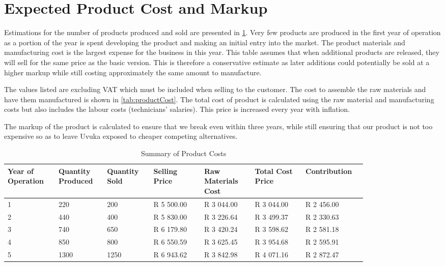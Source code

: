 \section{Expected Product Cost and Markup}
Estimations for the number of products produced and sold are presented in \cref{tab:ProductSales}. Very few products are produced in the first year of operation as a portion of the year is spent developing the product and making an initial entry into the market. The product materials and manufacturing cost is the largest expense for the business in this year. This table assumes that when additional products are released, they will sell for the same price as the basic version. This is therefore a conservative estimate as later additions could potentially be sold at a higher markup while still costing approximately the same amount to manufacture.

The values listed are excluding VAT which must be included when selling to the customer. The cost to assemble the raw materials and have them manufactured is shown in \cref{tab:productCost}. The total cost of product is calculated using the raw material and manufacturing costs but also includes the labour costs (technicians' salaries). This price is increased every year with inflation. 

The markup of the product is calculated to ensure that we break even within three years, while still ensuring that our product is not too expensive so as to leave Uvuka exposed to cheaper competing alternatives.

\begin{table}[htbp]
  \centering
  \caption{Summary of Product Costs}
    \begin{tabular}{p{0.12\linewidth}p{0.11\linewidth}p{0.11\linewidth}p{0.12\linewidth}p{0.12\linewidth}p{0.12\linewidth}p{0.12\linewidth}}
    \toprule
    \raggedright{Year of Operation} & Quantity Produced & Quantity Sold & Selling Price & Raw Materials Cost & \raggedright{Total Cost Price} & Contribution \\
    \midrule
    1     & 220   & 200   & R 5 500.00 & R 3 044.00 & R 3 044.00 & R 2 456.00 \\
    2     & 440   & 400   & R 5 830.00 & R 3 226.64 & R 3 499.37 & R 2 330.63 \\
    3     & 740   & 650   & R 6 179.80 & R 3 420.24 & R 3 598.62 & R 2 581.18 \\
    4     & 850   & 800   & R 6 550.59 & R 3 625.45 & R 3 954.68 & R 2 595.91 \\
    5     & 1300  & 1250  & R 6 943.62 & R 3 842.98 & R 4 071.16 & R 2 872.47 \\
    \bottomrule
    \end{tabular}%
  \label{tab:ProductSales}%
\end{table}%

